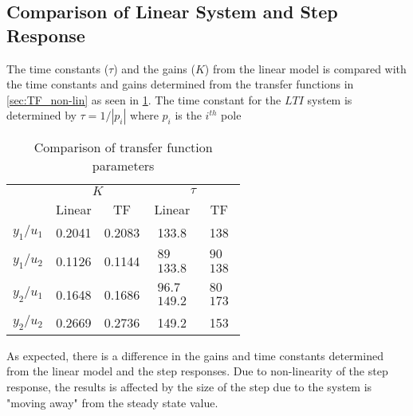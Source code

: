 \subsection{Comparison of Linear System and Step Response}
The time constants ($\tau$) and the gains ($K$) from the linear model is compared with the time constants and gains determined from the transfer functions in \cref{sec:TF_non-lin} as seen in \cref{tab:gain_tau}. The time constant for the $LTI$ system is determined by $\tau=1/|p_i|$ where $p_i$ is the $i^{th}$ pole
\begin{table}[H] 
\centering
\begin{tabular}{c|cc|cc|} \cline{2-5} 
\multirow{2}{*}{} & \multicolumn{2}{c|}{$K$} & \multicolumn{2}{c|}{$\tau$} \\ \cline{2-5} 
& \multicolumn{1}{c|}{Linear} & TF & \multicolumn{1}{c|}{Linear} & TF \\ \hline
\multicolumn{1}{|c|}{$y_1/u_1$} & \multicolumn{1}{c|}{0.2041} & 0.2083 & \multicolumn{1}{c|}{133.8} & 138 \\ \hline
\multicolumn{1}{|c|}{\multirow{2}{*}{$y_1/u_2$}} & \multicolumn{1}{c|}{\multirow{2}{*}{0.1126}} & \multirow{2}{*}{0.1144} & \multicolumn{1}{c|}{\multirow{2}{*}{$\begin{matrix} 89\\133.8\end{matrix}$}} & \multirow{2}{*}{$\begin{matrix} 90\\138\end{matrix}$} \\
\multicolumn{1}{|c|}{} & \multicolumn{1}{c|}{} & & \multicolumn{1}{c|}{} & \\ \hline
\multicolumn{1}{|c|}{\multirow{2}{*}{$y_2/u_1$}} & \multicolumn{1}{c|}{\multirow{2}{*}{0.1648}} & \multirow{2}{*}{0.1686} & \multicolumn{1}{c|}{\multirow{2}{*}{$\begin{matrix} 96.7\\149.2\end{matrix}$}} & \multirow{2}{*}{$\begin{matrix} 80\\173\end{matrix}$} \\
\multicolumn{1}{|c|}{} & \multicolumn{1}{c|}{} & & \multicolumn{1}{c|}{} & \\ \hline
\multicolumn{1}{|c|}{$y_2/u_2$} & \multicolumn{1}{c|}{0.2669} & 0.2736 & \multicolumn{1}{c|}{149.2} & 153 \\ \hline  \end{tabular} 
\caption{Comparison of transfer function parameters}
\label{tab:gain_tau}
 \end{table}
As expected, there is a difference in the gains and time constants determined from the linear model and the step responses. Due to non-linearity of the step response, the results is affected by the size of the step due to the system is "moving away" from the steady state value. 